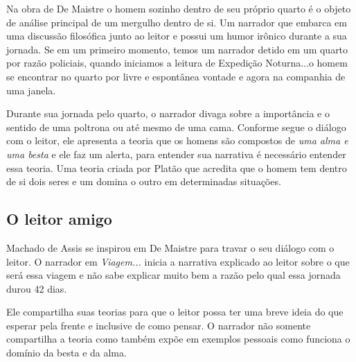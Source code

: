 \documentclass[12pt]{extarticle}
\begin{document}




Na obra de De Maistre o homem sozinho dentro de seu próprio quarto é o
objeto de análise principal de um mergulho dentro de si. Um narrador que
embarca em uma discussão filosófica junto ao leitor e possui um humor
irônico durante a sua jornada. Se em um primeiro momento, temos um
narrador detido em um quarto por razão policiais, quando iniciamos a
leitura de Expedição Noturna...o homem se encontrar no quarto por livre
e espontânea vontade e agora na companhia de uma janela.

Durante sua jornada pelo quarto, o narrador divaga sobre a importância e
o sentido de uma poltrona ou até mesmo de uma cama. Conforme segue o
diálogo com o leitor, ele apresenta a teoria que os homens são compostos
de \emph{uma alma e uma besta} e ele faz um alerta, para entender sua
narrativa é necessário entender essa teoria. Uma teoria criada por
Platão que acredita que o homem tem dentro de si dois seres e um domina
o outro em determinadas situações.

\subsection{O leitor amigo}

Machado de Assis se inspirou em De Maistre para travar o seu diálogo com
o leitor. O narrador em \emph{Viagem...} inicia a narrativa explicado ao
leitor sobre o que será essa viagem e não sabe explicar muito bem a
razão pelo qual essa jornada durou 42 dias.




Ele compartilha suas teorias para que o leitor possa ter uma breve ideia
do que esperar pela frente e inclusive de como pensar. O narrador não
somente compartilha a teoria como também expõe em exemplos pessoais como
funciona o domínio da besta e da alma.
\end{document}
